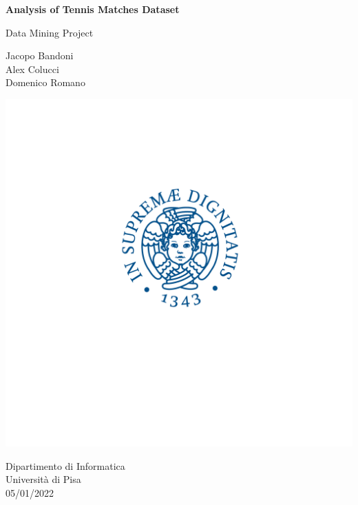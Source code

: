 \begin{titlepage}
    
    \begin{center}
        \vspace*{1cm}
            
        \Huge
        \textbf{Analysis of Tennis Matches Dataset}
            
        \vspace{0.5cm}
        \LARGE
        Data Mining Project
            
        \vspace{1.5cm}
            
        Jacopo Bandoni\\
        Alex Colucci\\
        Domenico Romano\\
            
        \vfill
            
        \includegraphics[width = 450 px]{logo_unipi.png}
        
            
            
        \Large
        Dipartimento di Informatica\\
        Università di Pisa\\
        05/01/2022
            
    \end{center}
\end{titlepage}